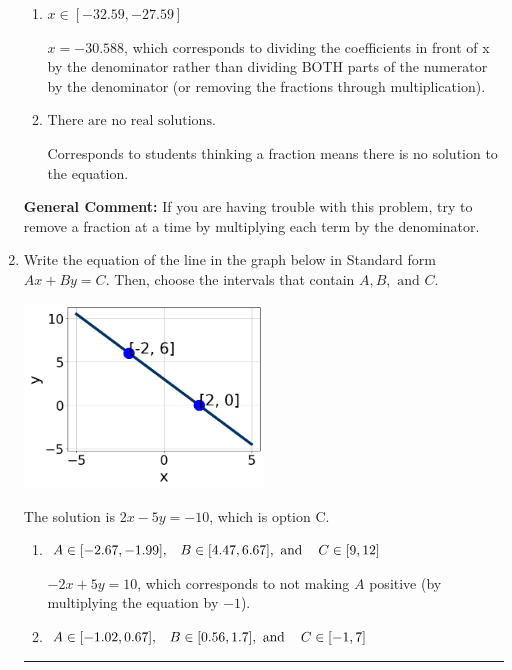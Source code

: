 \documentclass{extbook}[14pt]
\newcommand{\litem}[1]{\item #1

\rule{\textwidth}{0.4pt}}
\begin{document}
\begin{enumerate}
{\begin{enumerate}[label=\Alph*.]
 $x = 1.647$, which corresponds to not distributing the negative in front of the second fraction.
\item \( x \in [-32.59, -27.59] \)

 $x = -30.588$, which corresponds to dividing the coefficients in front of x by the denominator rather than dividing BOTH parts of the numerator by the denominator (or removing the fractions through multiplication).
\item \( \text{There are no real solutions.} \)

Corresponds to students thinking a fraction means there is no solution to the equation.
\end{enumerate}

\textbf{General Comment:} If you are having trouble with this problem, try to remove a fraction at a time by multiplying each term by the denominator.
}
\litem{
Write the equation of the line in the graph below in Standard form $Ax+By=C$. Then, choose the intervals that contain $A, B, \text{ and } C$.

\begin{center}
    \includegraphics[width=0.5\textwidth]{../Figures/linearGraphToStandardCopyC.png}
\end{center}


The solution is \( 2x - 5y = -10 \), which is option C.\begin{enumerate}[label=\Alph*.]
\item \( A \in [-2.67, -1.99], \hspace{3mm} B \in [4.47, 6.67], \text{ and } \hspace{3mm} C \in [9, 12] \)

 $-2x + 5y = 10$, which corresponds to not making $A$ positive (by multiplying the equation by $-1$).
\item \( A \in [-1.02, 0.67], \hspace{3mm} B \in [0.56, 1.7], \text{ and } \hspace{3mm} C \in [-1, 7] \)


\end{enumerate}}
\end{enumerate}
\end{document}
